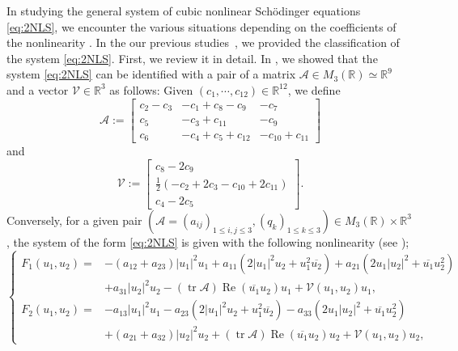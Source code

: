 \documentclass[11pt,a4paper,twosides]{amsart}
\theoremstyle{plain}
\theoremstyle{remark}
\numberwithin{equation}{section}
\newcommand{\R}{\mathbb{R}}
\renewcommand{\Re}{\operatorname{Re}}
\def\le{\leqslant}
\DeclareMathOperator{\tr}{tr}
\theoremstyle{definition}
\newcommand{\1}{{\bf 1}_{\{|x| < |t|\}}}
\newcommand{\ol}{\overline}
\begin{document}

 
In studying the general system of cubic nonlinear Sch\"odinger equations \eqref{eq:2NLS}, we encounter the 
various situations depending on the coefficients of the nonlinearity 
\cite{KaSa,Kim,LiNiSaSu1,LiNiSaSu2,LiNiSaSu5,LiSu,LiSu2,MuPu,Ur}. 
In the our previous studies~\cite{MaSeUr1,MaSeUr2}, 
we provided the classification of the system \eqref{eq:2NLS}. 
First, we review it in detail. 
In \cite{MaSeUr1}, we showed that the system \eqref{eq:2NLS} can be identified with a pair of a matrix $\mathscr{A} \in M_3(\R) \simeq \R^9$
and a vector $\mathscr{V} \in \R^3$ as follows:
Given $(c_1, \cdots, c_{12})\in \R^{12}$,
we define
\begin{equation}
  \mathscr{A} :=
  \begin{bmatrix}
    c_2 - c_3 & -c_1 + c_8 - c_9    & - c_7                  \\
    c_5             & -c_3 +c_{11}              & -c_9                   \\
    c_6             & -c_4 + c_5 + c_{12} & -c_{10} + c_{11}
  \end{bmatrix}
\end{equation}
and
\begin{equation}
  \mathscr{V}:=
  \begin{bmatrix}
    c_8-2c_9                                      \\
    \frac12(-c_2+2c_3-c_{10}+2c_{11}) \\
    c_4-2c_5
  \end{bmatrix}.
\end{equation}
Conversely, 
for a given pair $(\mathscr{A}=(a_{ij})_{1\le i,j \le 3}, (q_k)_{1\le k \le 3} )\in M_3(\R) \times \R^3$, the system of the form \eqref{eq:2NLS} 
is given with the following nonlinearity (see \cite{MaSeUr1});
\begin{equation}\label{E:CVNLS}
\left\{
\begin{aligned}
	F_1(u_1,u_2)={}&
-(a_{12}+a_{23}) |u_1|^2 u_1 +a_{11}(2|u_1|^2 u_2 + u_1^2\ol{u_2})+a_{21} (2 u_1 |u_2|^2 + \ol{u_1}u_2^2) \\&+ a_{31} |u_2|^2u_2
	 - (\tr \mathscr{A}) \Re (\overline{u_1} u_2) u_1 +\mathcal{V}(u_1,u_2) u_1, \\
	F_2(u_1,u_2)={}&
-a_{13} |u_1|^2 u_1-a_{23}(2|u_1|^2 u_2 + u_1^2\ol{u_2})-a_{33} (2 u_1 |u_2|^2 + \ol{u_1}u_2^2) \\&+ (a_{21}+a_{32}) |u_2|^2u_2
	 + (\tr \mathscr{A}) \Re (\overline{u_1} u_2) u_2 + \mathcal{V}(u_1,u_2)u_2,
\end{aligned}
\right.
\end{equation}
\end{document}
